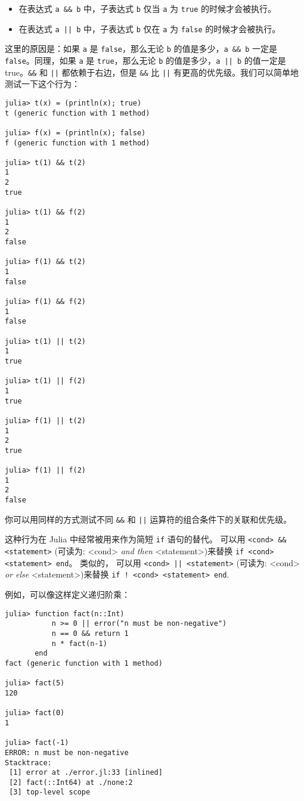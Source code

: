 \begin{itemize}
\item 在表达式 \texttt{a \&\& b} 中，子表达式 \texttt{b} 仅当 \texttt{a} 为 \texttt{true} 的时候才会被执行。


\item 在表达式 \texttt{a || b} 中，子表达式 \texttt{b} 仅在 \texttt{a} 为 \texttt{false} 的时候才会被执行。

\end{itemize}


这里的原因是：如果 \texttt{a} 是 \texttt{false}，那么无论 \texttt{b} 的值是多少，\texttt{a \&\& b} 一定是 \texttt{false}。同理，如果 \texttt{a} 是 \texttt{true}，那么无论 \texttt{b} 的值是多少，\texttt{a || b} 的值一定是 true。\texttt{\&\&} 和 \texttt{||} 都依赖于右边，但是 \texttt{\&\&} 比 \texttt{||} 有更高的优先级。我们可以简单地测试一下这个行为：




\begin{verbatim}
julia> t(x) = (println(x); true)
t (generic function with 1 method)

julia> f(x) = (println(x); false)
f (generic function with 1 method)

julia> t(1) && t(2)
1
2
true

julia> t(1) && f(2)
1
2
false

julia> f(1) && t(2)
1
false

julia> f(1) && f(2)
1
false

julia> t(1) || t(2)
1
true

julia> t(1) || f(2)
1
true

julia> f(1) || t(2)
1
2
true

julia> f(1) || f(2)
1
2
false
\end{verbatim}



你可以用同样的方式测试不同 \texttt{\&\&} 和 \texttt{||} 运算符的组合条件下的关联和优先级。



这种行为在 Julia 中经常被用来作为简短 \texttt{if} 语句的替代。 可以用 \texttt{<cond> \&\& <statement>} (可读为: <cond> \emph{and then} <statement>)来替换 \texttt{if <cond> <statement> end}。 类似的， 可以用 \texttt{<cond> || <statement>} (可读为: <cond> \emph{or else} <statement>)来替换 \texttt{if ! <cond> <statement> end}.



例如，可以像这样定义递归阶乘：




\begin{verbatim}
julia> function fact(n::Int)
           n >= 0 || error("n must be non-negative")
           n == 0 && return 1
           n * fact(n-1)
       end
fact (generic function with 1 method)

julia> fact(5)
120

julia> fact(0)
1

julia> fact(-1)
ERROR: n must be non-negative
Stacktrace:
 [1] error at ./error.jl:33 [inlined]
 [2] fact(::Int64) at ./none:2
 [3] top-level scope
\end{verbatim}



